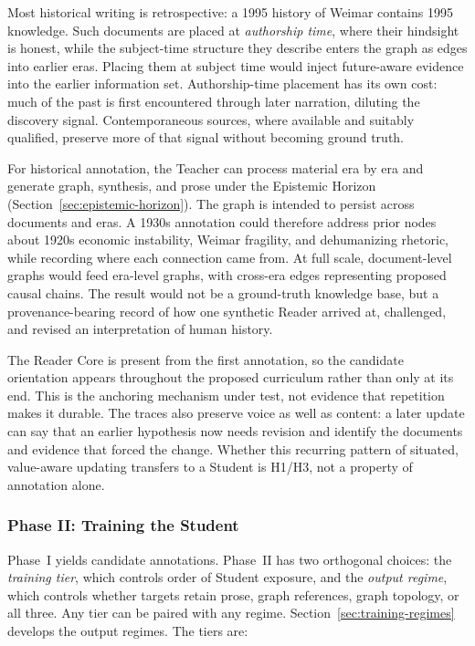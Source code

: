 Most historical writing is retrospective: a 1995 history of Weimar contains
1995 knowledge. Such documents are placed at \emph{authorship time}, where their
hindsight is honest, while the subject-time structure they describe enters the
graph as edges into earlier eras. Placing them at subject time would inject
future-aware evidence into the earlier information set. Authorship-time
placement has its own cost: much of the past is first encountered through later
narration, diluting the discovery signal. Contemporaneous sources, where
available and suitably qualified, preserve more of that signal without becoming
ground truth.

For historical annotation, the Teacher can process material era by era and
generate graph, synthesis, and prose under the Epistemic Horizon
(Section~\ref{sec:epistemic-horizon}). The graph is intended to persist across
documents and eras. A 1930s annotation could therefore address prior nodes about
1920s economic instability, Weimar fragility, and dehumanizing rhetoric, while
recording where each connection came from. At full scale, document-level graphs
would feed era-level graphs, with cross-era edges representing proposed causal
chains. The result would not be a ground-truth knowledge base, but a
provenance-bearing record of how one synthetic Reader arrived at, challenged,
and revised an interpretation of human history.

The Reader Core is present from the first annotation, so the candidate
orientation appears throughout the proposed curriculum rather than only at its
end. This is the anchoring mechanism under test, not evidence that repetition
makes it durable. The traces also preserve voice as well as content: a later
update can say that an earlier hypothesis now needs revision and identify the
documents and evidence that forced the change. Whether this recurring pattern
of situated, value-aware updating transfers to a Student is H1/H3, not a
property of annotation alone.

\subsubsection{Phase II: Training the Student}\label{sec:training-phase}

Phase~I yields candidate annotations. Phase~II has two orthogonal choices: the
\emph{training tier}, which controls order of Student exposure, and the
\emph{output regime}, which controls whether targets retain prose, graph
references, graph topology, or all three. Any tier can be paired with any regime.
Section~\ref{sec:training-regimes} develops the output regimes. The tiers are:

